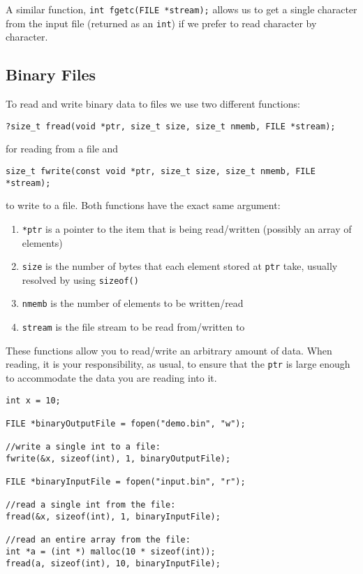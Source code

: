 A similar function, \texttt{int fgetc(FILE *stream);}
allows us to get a single character from the input file 
(returned as an \texttt{int}) if we prefer to read
character by character.

\subsection{Binary Files}

To read and write binary data to files we use two different
functions:

\texttt{?size_t fread(void *ptr, size_t size, size_t nmemb, FILE *stream);} 

for reading from a file and 

\texttt{size_t fwrite(const void *ptr, size_t size, size_t nmemb, FILE *stream);}

to write to a file.  Both functions have the exact same argument:
\begin{enumerate}
  \item \texttt{*ptr} is a pointer to the item that 
  	is being read/written (possibly an array of elements)
  \item \texttt{size} is the number of bytes that each 
	element stored at \texttt{ptr} take, usually resolved
	by using \texttt{sizeof()}
  \item \texttt{nmemb} is the number of elements to be 
  	written/read
  \item \texttt{stream} is the file stream to be read 
	from/written to
\end{enumerate}

These functions allow you to read/write an arbitrary amount of
data.  When reading, it is your responsibility, as usual, to 
ensure that the \texttt{ptr} is large enough to accommodate
the data you are reading into it.

\begin{verbatim}
int x = 10;

FILE *binaryOutputFile = fopen("demo.bin", "w");

//write a single int to a file:
fwrite(&x, sizeof(int), 1, binaryOutputFile);

FILE *binaryInputFile = fopen("input.bin", "r");

//read a single int from the file:
fread(&x, sizeof(int), 1, binaryInputFile);

//read an entire array from the file:
int *a = (int *) malloc(10 * sizeof(int));
fread(a, sizeof(int), 10, binaryInputFile);
\end{verbatim}

